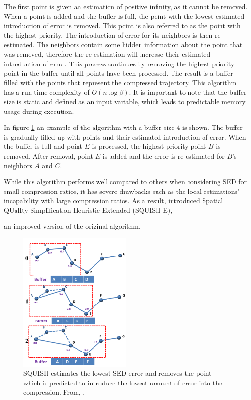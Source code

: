 The first point is given an estimation of positive infinity, as it cannot be removed. When a point is added and the buffer is full, the point with the lowest estimated introduction of error is removed. This point is also referred to as the point with the highest priority. The introduction of error for its neighbors is then re-estimated. The neighbors contain some hidden information about the point that was removed, therefore the re-estimation will increase their estimated introduction of error. This process continues by removing the highest priority point in the buffer until all points have been processed. The result is a buffer filled with the points that represent the compressed trajectory. This algorithm has a run-time complexity of $O(n\log{\beta})$. It is important to note that the buffer size is static and defined as an input variable, which leads to predictable memory usage during execution.

In figure \ref{fig:squish} an example of the algorithm with a buffer size 4 is shown. The buffer is gradually filled up with points and their estimated introduction of error. When the buffer is full and point $E$ is processed, the highest priority point $B$ is removed. After removal, point $E$ is added and the error is re-estimated for $B$'s neighbors $A$ and $C$.

While this algorithm performs well compared to others when considering SED for small compression ratios, it has severe drawbacks such as the local estimations' incapability with large compression ratios. As a result, \textcite{muckell2014compression} introduced Spatial QUalIty Simplification Heuristic Extended (SQUISH-E), \raggedright an improved version of the original algorithm.
\begin{figure}
    \includegraphics[width=0.5\textwidth]{./figures/squish.png}
    \caption{SQUISH estimates the lowest SED error
        and removes the point which is predicted to introduce
        the lowest amount of error into the compression. From, \cite{muckell2011squish}.}
    \label{fig:squish}
\end{figure}

